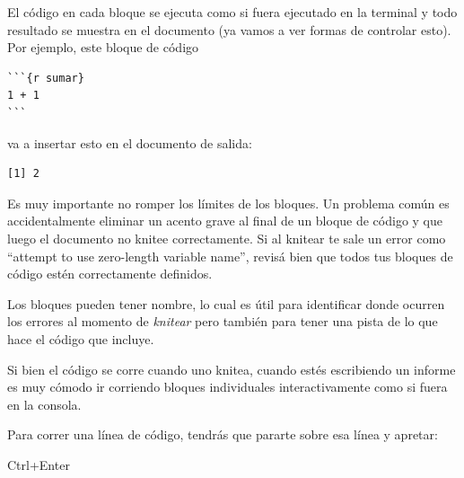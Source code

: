 \documentclass[
  letterpaper,
  DIV=11,
  numbers=noendperiod]{scrartcl}
\begin{document}
El código en cada bloque se ejecuta como si fuera ejecutado en la
terminal y todo resultado se muestra en el documento (ya vamos a ver
formas de controlar esto). Por ejemplo, este bloque de código

\begin{verbatim}
```{r sumar}
1 + 1
```
\end{verbatim}

va a insertar esto en el documento de salida:

\begin{verbatim}
[1] 2
\end{verbatim}

\begin{tcolorbox}[enhanced jigsaw, arc=.35mm, title=\textcolor{quarto-callout-important-color}{\faExclamation}\hspace{0.5em}{Importante}, coltitle=black, bottomrule=.15mm, breakable, colbacktitle=quarto-callout-important-color!10!white, bottomtitle=1mm, opacityback=0, toptitle=1mm, left=2mm, opacitybacktitle=0.6, rightrule=.15mm, toprule=.15mm, colback=white, colframe=quarto-callout-important-color-frame, leftrule=.75mm, titlerule=0mm]
Es muy importante no romper los límites de los bloques. Un problema
común es accidentalmente eliminar un acento grave al final de un bloque
de código y que luego el documento no knitee correctamente. Si al
knitear te sale un error como ``attempt to use zero-length variable
name'', revisá bien que todos tus bloques de código estén correctamente
definidos.
\end{tcolorbox}

Los bloques pueden tener nombre, lo cual es útil para identificar donde
ocurren los errores al momento de \emph{knitear} pero también para tener
una pista de lo que hace el código que incluye.

Si bien el código se corre cuando uno knitea, cuando estés escribiendo
un informe es muy cómodo ir corriendo bloques individuales
interactivamente como si fuera en la consola.

Para correr una línea de código, tendrás que pararte sobre esa línea y
apretar:

\begin{tcolorbox}[enhanced jigsaw, arc=.35mm, title=\textcolor{quarto-callout-note-color}{\faInfo}\hspace{0.5em}{Instrucciones}, coltitle=black, bottomrule=.15mm, breakable, colbacktitle=quarto-callout-note-color!10!white, bottomtitle=1mm, opacityback=0, toptitle=1mm, left=2mm, opacitybacktitle=0.6, rightrule=.15mm, toprule=.15mm, colback=white, colframe=quarto-callout-note-color-frame, leftrule=.75mm, titlerule=0mm]
Ctrl+Enter
\end{tcolorbox}
\end{document}
